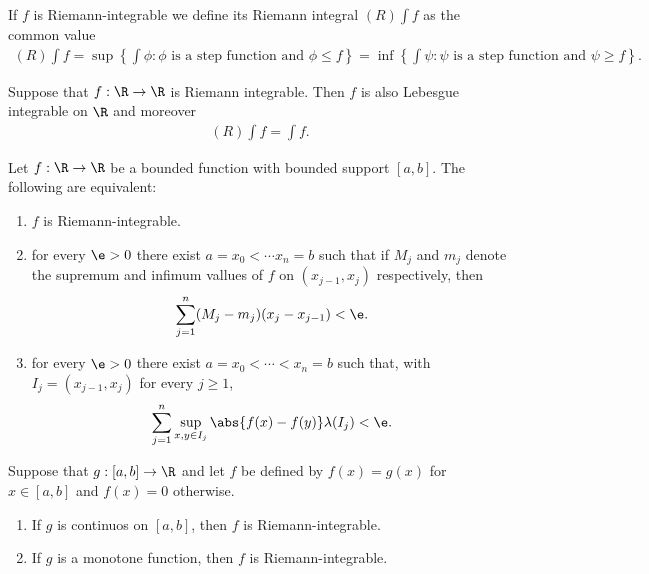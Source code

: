 \documentclass{article}
\begin{document}
\begin{definition}[Notes 4.5]
    If $f$ is Riemann-integrable we define its Riemann integral $(R) \int f$ as the common 
    value 
    \begin{align*}
        (R) \int f
        =\sup\left\lbrace\int\phi : \phi\text{ is a step function and }\phi\leq f\right\rbrace
        = \inf\left\lbrace\int\psi : \psi\text{ is a step function and }\psi \geq f\right\rbrace.
    \end{align*} 
\end{definition}

\begin{theorem}[Notes 4.6]
    Suppose that $f:\R\to\R$ is Riemann integrable. Then $f$ is also Lebesgue integrable on $\R$ 
    and moreover 
    \begin{align*}
        (R) \int f = \int f.
    \end{align*} 
\end{theorem}

\begin{lemma}[Notes 4.1]
    Let $f:\R\to\R$ be a bounded function with bounded support $[a,b]$. The following are equivalent:
    \begin{enumerate}
        \item $f$ is Riemann-integrable.
        \item for every $\e>0$ there exist $a=x_0<\cdots x_n=b$ such that if $M_j$ and $m_j$ 
            denote the supremum and infimum vallues of $f$ on $(x_{j-1}, x_j)$ respectively, then \begin{align*}
                \sum_{j=1}^n (M_j-m_j)(x_j-x_{j-1})<\e.
            \end{align*}
        \item for every $\e>0$ there exist $a=x_0<\cdots<x_n=b$ such that, with $I_j=(x_{j-1},x_j)$ 
            for every $j\geq 1$, \begin{align*}
                \sum_{j=1}^n \sup_{x,y\in I_j} \abs{f(x)-f(y)}\lambda(I_j)<\e.
            \end{align*}
    \end{enumerate} 
\end{lemma}  

\begin{theorem}[Notes 4.7]
    Suppose that $g:[a,b]\to\R$ and let $f$ be defined by $f(x)=g(x)$ for $x\in[a,b]$ and $f(x)=0$
    otherwise.
    \begin{enumerate}
        \item If $g$ is continuos on $[a,b]$, then $f$ is Riemann-integrable.
        \item If $g$ is a monotone function, then $f$ is Riemann-integrable.
    \end{enumerate}
\end{theorem}
\end{document}
